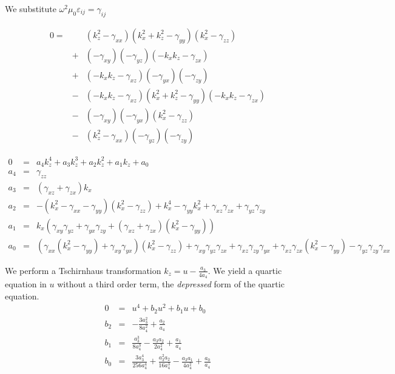 \documentclass[12pt,a4paper,twoside,openright,BCOR10mm,headsepline,titlepage,abstracton,chapterprefix,final]{scrreprt}
\newcommand\vacuum{0}
\newcommand\wavenumber{k}
\newcommand\vacuumpermeability{\scalarpermeability_{\vacuum}}
\newcommand\scalarpermeability{\mu}
\newcommand\scalarpermittivity{\varepsilon}
\begin{document}
We substitute $\omega^2 \vacuumpermeability \scalarpermittivity_{ij} = \gamma_{ij}$

\begin{eqnarray}
 0 =&&
     ( \wavenumber_z^2 -  \gamma_{xx} ) 
     ( \wavenumber_x^2 + \wavenumber_z^2 -  \gamma_{yy} )
     ( \wavenumber_x^2 -  \gamma_{zz} )
   \nonumber\\
   &+&
     ( -  \gamma_{xy} )  
     ( -  \gamma_{yz} )
     ( - \wavenumber_x \wavenumber_z -  \gamma_{zx} )
   \nonumber\\
   &+&
     ( - \wavenumber_x \wavenumber_z -  \gamma_{xz} )
     ( -  \gamma_{yx} )
     ( -  \gamma_{zy} )
   \nonumber\\
   &-&  
     ( - \wavenumber_x \wavenumber_z -  \gamma_{xz} )
     (   \wavenumber_x^2 + \wavenumber_z^2 -  \gamma_{yy} )
     ( - \wavenumber_x \wavenumber_z -  \gamma_{zx} )
   \nonumber\\
   &-&
     ( -  \gamma_{xy} )
     ( -  \gamma_{yx} )
     (   \wavenumber_x^2 -  \gamma_{zz} )
   \nonumber\\
   &-&
     (   \wavenumber_z^2 -  \gamma_{xx} )
     ( -  \gamma_{yz} )
     (  -  \gamma_{zy} )
\end{eqnarray}

\begin{eqnarray}
 0   &=& a_4 \wavenumber_z^4 + a_3 \wavenumber_z^3 + a_2 \wavenumber_z^2 + a_1 \wavenumber_z + a_0 \\
 a_4 &=& 
      \gamma_{zz} 
    \\
 a_3 &=& 
      (\gamma_{xz}+\gamma_{zx}) \wavenumber_x
    \\
 a_2 &=& 
     -  (\wavenumber_x^2 - \gamma_{xx} - \gamma_{yy}) ( \wavenumber_x^2 -  \gamma_{zz} )
     + \wavenumber_x^4
     - \gamma_{yy}  \wavenumber_x^2
     + \gamma_{xz} \gamma_{zx}
     + \gamma_{yz} \gamma_{zy}
    \\
a_1 &=& 
     \wavenumber_x 
     \left( 
        \gamma_{xy} \gamma_{yz} 
       + \gamma_{yx} \gamma_{zy}
       + (\gamma_{xz}+\gamma_{zx}) ( \wavenumber_x^2 - \gamma_{yy} )
     \right)
    \\
a_0 &=& 
     ( \gamma_{xx} (\wavenumber_x^2 - \gamma_{yy}) + \gamma_{xy} \gamma_{yx} ) ( \wavenumber_x^2 -  \gamma_{zz} )
     + \gamma_{xy} \gamma_{yz} \gamma_{zx}
     + \gamma_{xz} \gamma_{zy} \gamma_{yx}
     + \gamma_{xz} \gamma_{zx} ( \wavenumber_x^2 - \gamma_{yy} ) 
     - \gamma_{yz} \gamma_{zy} \gamma_{xx}    
\end{eqnarray}

We perform a Tschirnhaus transformation $\wavenumber_z = u - \tfrac{a_3}{4 a_4}$. 
We yield a quartic equation in $u$ without a third order term, the \emph{depressed} form of the quartic equation.
\begin{eqnarray}
 0   &=& u^4 + b_2 u^2 + b_1 u + b_0 \\
 b_2 &=& -\frac{3 a_3^2}{8 a_4^2} + \frac{a_2}{a_4}\\
 b_1 &=& \frac{a_3^3}{8 a_4^3} - \frac{a_3 a_2}{2 a_4^2}+ \frac{a_1}{a_4}\\
 b_0 &=& \frac{3 a_3^4}{256 a_4^4} + \frac{a_3^2 a_2}{16 a_4^3}-\frac{a_3 a_1}{4 a_4^2} + \frac{a_0}{a_4}
\end{eqnarray}
\end{document}
